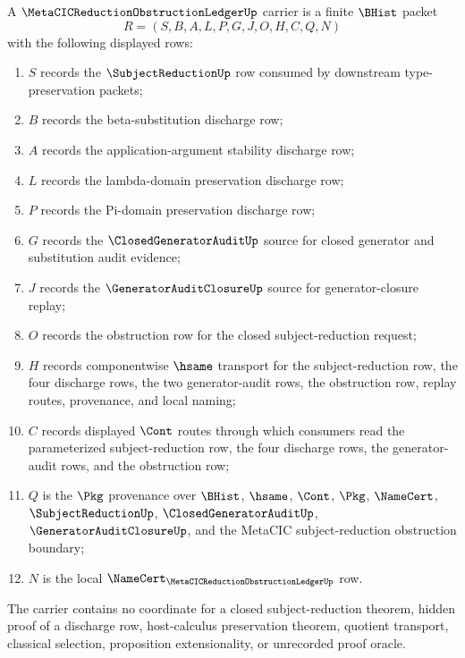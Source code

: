 \begin{definition}
\label{def:metacic-reduction-obstruction-ledger-carrier}
A $\MetaCICReductionObstructionLedgerUp$ carrier is a finite $\BHist$ packet
$$
R=(S,B,A,L,P,G,J,O,H,C,Q,N)
$$
with the following displayed rows:
\begin{enumerate}
\item $S$ records the $\SubjectReductionUp$ row consumed by downstream type-preservation packets;
\item $B$ records the beta-substitution discharge row;
\item $A$ records the application-argument stability discharge row;
\item $L$ records the lambda-domain preservation discharge row;
\item $P$ records the Pi-domain preservation discharge row;
\item $G$ records the $\ClosedGeneratorAuditUp$ source for closed generator and substitution audit evidence;
\item $J$ records the $\GeneratorAuditClosureUp$ source for generator-closure replay;
\item $O$ records the obstruction row for the closed subject-reduction request;
\item $H$ records componentwise $\hsame$ transport for the subject-reduction row, the four discharge rows, the two generator-audit rows, the obstruction row, replay routes, provenance, and local naming;
\item $C$ records displayed $\Cont$ routes through which consumers read the parameterized subject-reduction row, the four discharge rows, the generator-audit rows, and the obstruction row;
\item $Q$ is the $\Pkg$ provenance over $\BHist$, $\hsame$, $\Cont$, $\Pkg$, $\NameCert$, $\SubjectReductionUp$, $\ClosedGeneratorAuditUp$, $\GeneratorAuditClosureUp$, and the MetaCIC subject-reduction obstruction boundary;
\item $N$ is the local $\NameCert_{\MetaCICReductionObstructionLedgerUp}$ row.
\end{enumerate}
The carrier contains no coordinate for a closed subject-reduction theorem, hidden proof of a discharge row, host-calculus preservation theorem, quotient transport, classical selection, proposition extensionality, or unrecorded proof oracle.
\end{definition}

